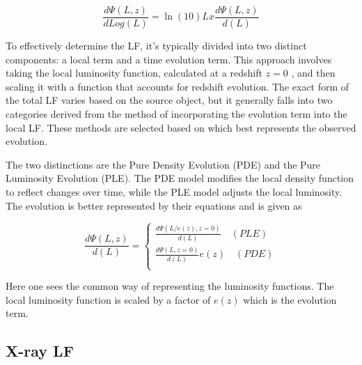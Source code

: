 \documentclass{article}
\begin{document}
\begin{equation}
    \frac{d\Psi(L,z)}{dLog(L)} =  \ln (10)  Lx \frac{d\Psi(L,z)}{d(L)}
\end{equation}


To effectively determine the LF, it's typically divided into two distinct components: a local term and a time evolution term.
 This approach involves taking the local luminosity function, calculated at a redshift 
$z=0$
, and then scaling it with a function that accounts for redshift evolution. 
The exact form of the total LF varies based on the source object, but it generally falls into two categories derived from the method of incorporating the evolution term into the local LF.
 These methods are selected based on which best represents the observed evolution.

 The two distinctions are the Pure Density Evolution (PDE) and the Pure Luminosity Evolution (PLE). 
 The PDE model modifies the local density function to reflect changes over time, 
 while the PLE model adjusts the local luminosity. The evolution is better represented by their equations and is given as 

\begin{equation}\frac{d\Psi(L,z)}{d(L)} = 
    \begin{cases}
        \frac{d\Psi(L/e(z),z=0)}{d(L)} \quad (PLE)\\
        \frac{d\Psi(L,z=0)}{d(L)}e(z) \quad (PDE)\\
    \end{cases}
\end{equation}

Here one sees the common way of representing the luminosity functions. The local luminosity function is scaled by a factor of $e(z)$ which is the evolution term.
\subsection{X-ray LF}
\end{document}
